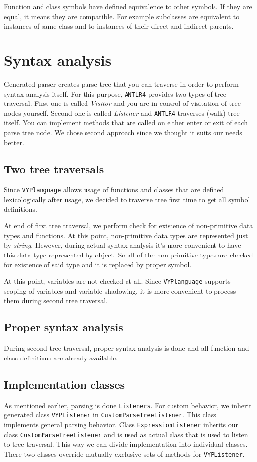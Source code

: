 \documentclass[a4paper, 11pt]{article}
\begin{document}
Function and class symbols have defined equivalence to other symbols. If they are equal, it means they are compatible. For example subclasses are equivalent to instances of same class and to instances of their direct and indirect parents.

\section{Syntax analysis}
Generated parser creates parse tree that you can traverse in order to perform syntax analysis itself. For this purpose, \texttt{ANTLR4} provides two types of tree traversal. First one is called \textit{Visitor} and you are in control of visitation of tree nodes yourself. Second one is called \textit{Listener} and \texttt{ANTLR4} traverses (walk) tree itself. You can implement methods that are called on either enter or exit of each parse tree node. We chose second approach since we thought it suits our needs better. 

\subsection{Two tree traversals}
Since \texttt{VYPlanguage} allows usage of functions and classes that are defined lexicologically after usage, we decided to traverse tree first time to get all symbol definitions.

At end of first tree traversal, we perform check for existence of non-primitive data types and functions. At this point, non-primitive data types are represented just by \textit{string}. However, during actual syntax analysis it's more convenient to have this data type represented by object. So all of the non-primitive types are checked for existence of said type and it is replaced by proper symbol.

At this point, variables are not checked at all. Since \texttt{VYPlanguage} supports scoping of variables and variable shadowing, it is more convenient to process them during second tree traversal.

\subsection{Proper syntax analysis}
During second tree traversal, proper syntax analysis is done and all function and class definitions are already available.

\subsection{Implementation classes}
As mentioned earlier, parsing is done \texttt{Listeners}. For custom behavior, we inherit generated class \texttt{VYPListener} in \texttt{CustomParseTreeListener}. This class implements general parsing behavior. Class \texttt{ExpressionListener} inherits our class \texttt{CustomParseTreeListener} and is used as actual class that is used to listen to tree traversal. This way we can divide implementation into individual classes. There two classes override mutually exclusive sets of methods for \texttt{VYPListener}.
\end{document}
